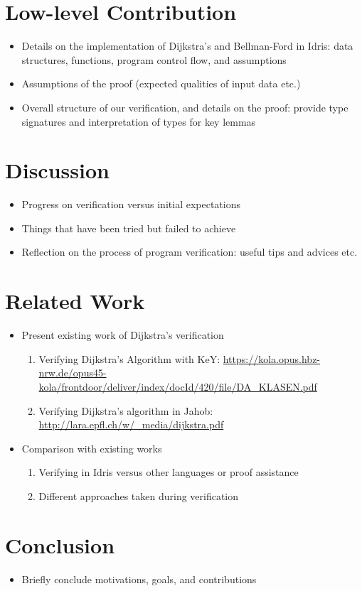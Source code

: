 \documentclass[12pt, oneside]{article}
\begin{document}
\section{Low-level Contribution}
\begin{itemize}
	\item Details on the implementation of Dijkstra's and Bellman-Ford in Idris: data structures, functions, program control flow, and assumptions
	\item Assumptions of the proof (expected qualities of input data etc.)
	\item Overall structure of our verification, and details on the proof: provide type signatures and interpretation of types for key lemmas
\end{itemize}

\section{Discussion}
\begin{itemize}
	\item Progress on verification versus initial expectations
	\item Things that have been tried but failed to achieve
	\item Reflection on the process of program verification: useful tips and advices etc. 
\end{itemize}

\section{Related Work}
\begin{itemize}
	\item Present existing work of Dijkstra's verification
		\begin{enumerate}
			\item Verifying Dijkstra's Algorithm with KeY: \url{https://kola.opus.hbz-nrw.de/opus45-kola/frontdoor/deliver/index/docId/420/file/DA_KLASEN.pdf}
			\item Verifying Dijkstra’s algorithm in Jahob: \url{http://lara.epfl.ch/w/_media/dijkstra.pdf}
		\end{enumerate}
	\item Comparison with existing works
		\begin{enumerate}
			\item Verifying in Idris versus other languages or proof assistance
			\item Different approaches taken during verification
		\end{enumerate}
\end{itemize}

\section{Conclusion}
\begin{itemize}
	\item Briefly conclude motivations, goals, and contributions
\end{itemize}
\end{document}
